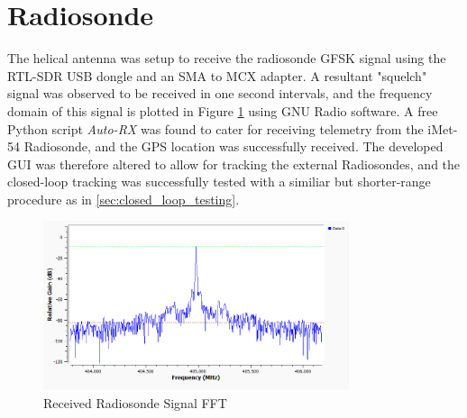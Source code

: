 \graphicspath{{./figures}}

\section{Radiosonde}

The helical antenna was setup to receive the radiosonde GFSK signal using the RTL-SDR USB dongle and an SMA to MCX adapter. A resultant "squelch" signal was observed to be received in one second intervals, and the frequency domain of this signal is plotted in Figure \ref{fig:radiosondeSpectrum} using GNU Radio software. A free Python script \textit{Auto-RX} was found to cater for receiving telemetry from the iMet-54 Radiosonde, and the GPS location was successfully received. The developed GUI was therefore altered to allow for tracking the external Radiosondes, and the closed-loop tracking was successfully tested with a similiar but shorter-range procedure as in \ref{sec:closed_loop_testing}.

\begin{figure}[!htb]
  \centering
  \includegraphics[width=0.8\textwidth]{radiosondeSpectrum}
  \caption{Received Radiosonde Signal FFT}
  \label{fig:radiosondeSpectrum}
\end{figure}